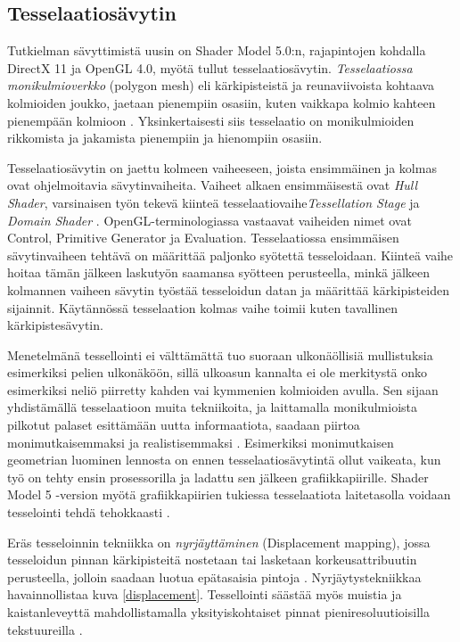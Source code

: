 \documentclass[finnish]{tktltiki2}
\theoremstyle{definition}
\theoremstyle{remark}
\begin{document}
\subsection{Tesselaatiosävytin}

Tutkielman sävyttimistä uusin on Shader Model 5.0:n, rajapintojen kohdalla DirectX 11 ja OpenGL 4.0, myötä tullut tesselaatiosävytin. \emph{Tesselaatiossa} \emph{monikulmioverkko} (polygon mesh) eli kärkipisteistä ja reunaviivoista kohtaava kolmioiden joukko\cite{Puh08}, jaetaan pienempiin osasiin, kuten vaikkapa kolmio kahteen pienempään kolmioon \cite{Nvi10}. Yksinkertaisesti siis tesselaatio on monikulmioiden rikkomista ja jakamista pienempiin ja hienompiin osasiin. 

Tesselaatiosävytin on jaettu kolmeen vaiheeseen, joista ensimmäinen ja kolmas ovat ohjelmoitavia sävytinvaiheita. Vaiheet alkaen ensimmäisestä ovat \emph{Hull Shader}, varsinaisen työn tekevä kiinteä tesselaatiovaihe\emph{Tessellation Stage} ja \emph{Domain Shader} \cite{Mic11}. OpenGL-terminologiassa vastaavat vaiheiden nimet ovat Control, Primitive Generator ja Evaluation. Tesselaatiossa ensimmäisen sävytinvaiheen tehtävä on määrittää paljonko syötettä tesseloidaan. Kiinteä vaihe hoitaa tämän jälkeen laskutyön saamansa syötteen perusteella, minkä jälkeen kolmannen vaiheen sävytin työstää tesseloidun datan ja määrittää kärkipisteiden sijainnit. Käytännössä tesselaation kolmas vaihe toimii kuten tavallinen kärkipistesävytin.

Menetelmänä tessellointi ei välttämättä tuo suoraan ulkonäöllisiä mullistuksia esimerkiksi pelien ulkonäköön, sillä ulkoasun kannalta ei ole merkitystä onko esimerkiksi neliö piirretty kahden vai kymmenien kolmioiden avulla. Sen sijaan yhdistämällä tesselaatioon muita tekniikoita, ja laittamalla monikulmioista pilkotut palaset esittämään uutta informaatiota, saadaan piirtoa monimutkaisemmaksi ja realistisemmaksi \cite{Nvi10}. Esimerkiksi monimutkaisen geometrian luominen lennosta on ennen tesselaatiosävytintä ollut vaikeata, kun työ on tehty ensin prosessorilla ja ladattu sen jälkeen grafiikkapiirille. Shader Model 5 -version myötä grafiikkapiirien tukiessa tesselaatiota laitetasolla voidaan tesselointi tehdä tehokkaasti \cite{Sch14}.

Eräs tesseloinnin tekniikka on \emph{nyrjäyttäminen} (Displacement mapping), jossa tesseloidun pinnan kärkipisteitä nostetaan tai lasketaan korkeusattribuutin perusteella, jolloin saadaan luotua epätasaisia pintoja \cite{Nvi10}. Nyrjäytystekniikkaa havainnollistaa kuva \ref{displacement}. Tessellointi säästää myös muistia ja kaistanleveyttä mahdollistamalla yksityiskohtaiset pinnat pieniresoluutioisilla tekstuureilla \cite{Mic11} \cite{Nvi10}.
\end{document}
